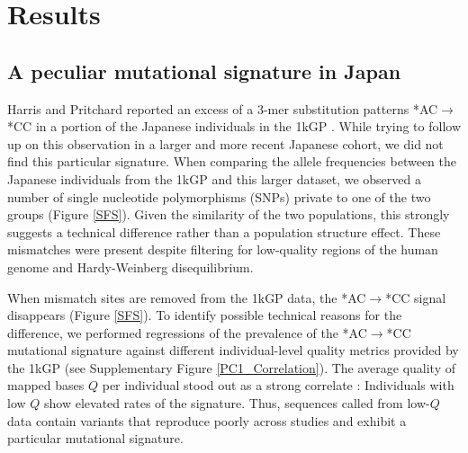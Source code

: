 \documentclass[9pt,lineno]{elife}
\begin{document}
\section{Results}

			
\subsection{A peculiar mutational signature in Japan}			
	
Harris and Pritchard reported an excess of a 3-mer substitution patterns *AC${\rightarrow}$*CC in a portion of the Japanese individuals in the 1kGP \citep{Harris2017a}.
While trying to follow up on this observation in a larger and more recent Japanese cohort, we did not find this particular signature.
When comparing the allele frequencies between the Japanese individuals from the 1kGP and this larger dataset, we observed a number of single nucleotide polymorphisms (SNPs) private to one of the two groups (Figure \ref{SFS}).
Given the similarity of the two populations, this strongly suggests a technical difference rather than a population structure effect.
These mismatches were present despite filtering for low-quality regions of the human genome and Hardy-Weinberg disequilibrium. 

When mismatch sites are removed from the 1kGP data, the  *AC${\rightarrow}$*CC signal disappears (Figure \ref{SFS}). To identify possible technical reasons for the difference, we performed regressions of the prevalence of the  *AC${\rightarrow}$*CC mutational signature against different individual-level quality metrics provided by the 1kGP (see Supplementary Figure \ref{PC1_Correlation}). 
The average quality of mapped bases  $Q$ per individual stood out as a strong correlate : Individuals with low $Q$ show elevated rates of the signature. 
Thus, sequences called from low-$Q$ data contain variants that reproduce poorly across studies and exhibit a particular mutational signature. 
\end{document}
